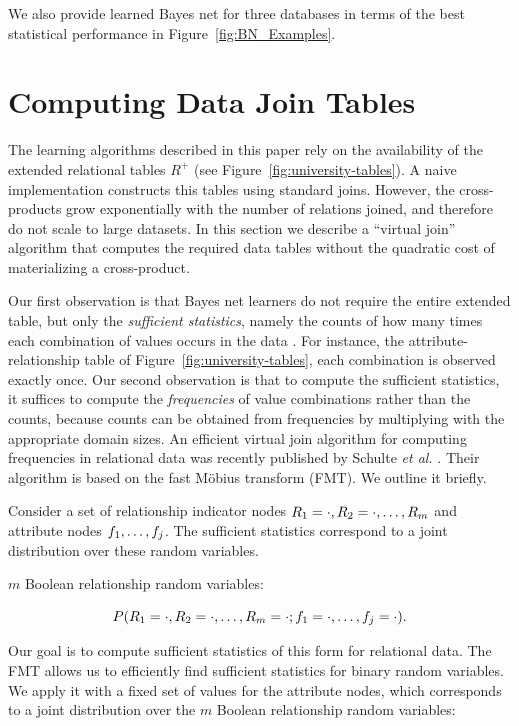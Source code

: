 \documentclass[runningheads,a4paper]{llncs}
\begin{document}
We also provide learned Bayes net for three databases in terms of the best statistical performance in  Figure~\ref{fig:BN_Examples}.



\section{Computing Data Join Tables} \label{sec:mobius}

The learning algorithms described in this paper rely on the  availability of the extended relational tables $R^{+}$ (see Figure~\ref{fig:university-tables}). A naive implementation constructs this tables using standard joins. However, the cross-products grow exponentially with the number of relations joined, and therefore do not scale to large datasets. In this section we describe a ``virtual join'' algorithm that computes the required data tables without the quadratic cost of materializing a cross-product. 

Our first observation is that Bayes net learners do not require the entire extended table, but  only the {\em sufficient statistics}, namely the counts of how many times each combination of values occurs in the data \cite{Neapolitan2004}. For instance, the attribute-relationship table of Figure~\ref{fig:university-tables}, each combination is observed exactly once. Our second observation is that to compute the sufficient statistics, it suffices to compute the {\em frequencies} of value combinations rather than the counts, because counts can be obtained from frequencies by multiplying with the appropriate domain sizes. An efficient virtual join algorithm for computing frequencies in relational data was recently published by Schulte {\em et al.} \cite{Schulte2013}. Their algorithm is based on the fast M\"obius transform (FMT). We outline it briefly. 


Consider a set of relationship indicator nodes $R_{1} = \cdot, R_{2} = \cdot,\ldots, R_{m}$ and attribute nodes $f_{1},\ldots,f_{j}$. The sufficient statistics correspond to a joint distribution over these random variables.

$m$ Boolean relationship random variables:

$$P(R_{1} = \cdot, R_{2} = \cdot,\ldots, R_{m} = \cdot; f_{1} = \cdot,\ldots,f_{j} = \cdot).$$

Our goal is to compute sufficient statistics of this form for relational data. The FMT allows us to efficiently find sufficient statistics for binary random variables. We apply it with a fixed set of values for the attribute nodes, which corresponds to a joint distribution over the $m$ Boolean relationship random variables:
\end{document}
